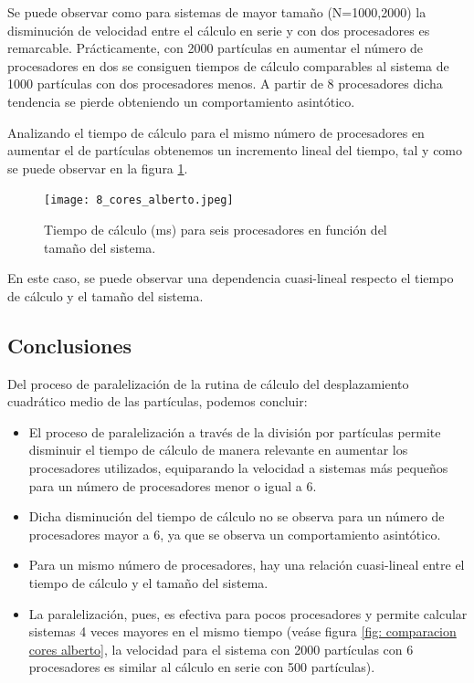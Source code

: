 \documentclass[onecolumn]{article}
\begin{document}
Se puede observar como para sistemas de mayor tamaño (N=1000,2000) la disminución de velocidad entre el cálculo en serie y con dos procesadores es remarcable. Prácticamente, con 2000 partículas en aumentar el número de procesadores en dos se consiguen tiempos de cálculo comparables al sistema de 1000 partículas con dos procesadores menos. A partir de 8 procesadores dicha tendencia se pierde obteniendo un comportamiento asintótico.

Analizando el tiempo de cálculo para el mismo número de procesadores en aumentar el de partículas obtenemos un incremento lineal del tiempo, tal y como se puede observar en la figura \ref{fig: comparacionparticulasalberto}.
\begin{figure}[h!]
\texttt{[image: 8\_cores\_alberto.jpeg]} 
\caption{Tiempo de cálculo (ms) para seis procesadores en función del tamaño del sistema.} 
\label{fig: comparacionparticulasalberto}
\end{figure}
En este caso, se puede observar una dependencia cuasi-lineal respecto el tiempo de cálculo y el tamaño del sistema.

\subsection{Conclusiones}
Del proceso de paralelización de la rutina de cálculo del desplazamiento cuadrático medio de las partículas, podemos concluir:
\begin{itemize}
\item El proceso de paralelización a través de la división por partículas permite disminuir el tiempo de cálculo de manera relevante en aumentar los procesadores utilizados, equiparando la velocidad a sistemas más pequeños para un número de procesadores menor o igual a 6.
\item Dicha disminución del tiempo de cálculo no se observa para un número de procesadores mayor a 6, ya que se observa un comportamiento asintótico.
\item Para un mismo número de procesadores, hay una relación cuasi-lineal entre el tiempo de cálculo y el tamaño del sistema.
\item La paralelización, pues, es efectiva para pocos procesadores y permite calcular sistemas 4 veces mayores en el mismo tiempo (veáse figura \ref{fig: comparacion cores alberto}, la velocidad para el sistema con 2000 partículas con 6 procesadores es similar al cálculo en serie con 500 partículas). 
\end{itemize}
\end{document}
